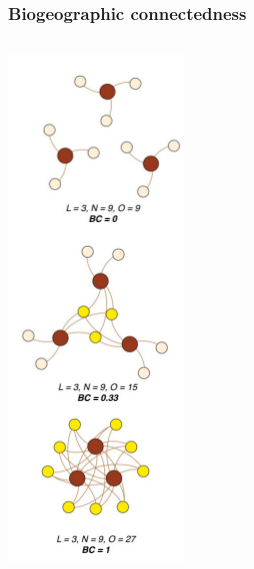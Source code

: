 \documentclass{beamer} \usepackage{amsmath,amsthm}
\begin{document}
\begin{frame}
  \frametitle{Biogeographic connectedness}

  \begin{columns}
    \begin{column}{0.5\textwidth}
      \begin{center}
        \includegraphics[height=0.8\textheight,width=\textwidth,keepaspectratio=true]{figure/bc}


\end{center}
\end{column}
\end{columns}
\end{frame}
\end{document}
